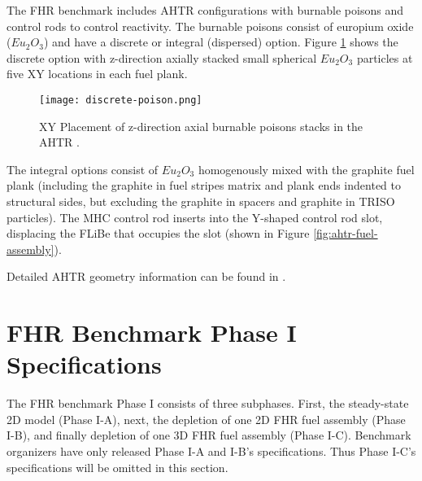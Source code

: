 The \gls{FHR} benchmark includes \gls{AHTR} configurations with burnable poisons 
and control rods to control reactivity. 
The burnable poisons consist of europium oxide ($Eu_2O_3$) and have a discrete
or integral (dispersed) option. 
Figure \ref{fig:discrete-poison} shows the discrete option with z-direction axially 
stacked small spherical $Eu_2O_3$ particles at five XY locations in each 
fuel plank. 
\begin{figure}[htbp]
    \centering
    \texttt{[image: discrete-poison.png]}
    \caption{XY Placement of z-direction axial burnable poisons stacks in the \acrlong{AHTR} 
    \cite{petrovic_benchmark_2021}.}
    \label{fig:discrete-poison}
\end{figure}
The integral options consist of $Eu_2O_3$ homogenously mixed with the graphite 
fuel plank (including the graphite in fuel stripes matrix and plank ends 
indented to structural sides, but excluding the graphite in spacers and 
graphite in TRISO particles).
The \gls{MHC} control rod inserts into the Y-shaped control rod slot, displacing
the \gls{FLiBe} that occupies the slot 
(shown in Figure \ref{fig:ahtr-fuel-assembly}). 

Detailed \gls{AHTR} geometry information can be found in \cite{petrovic_benchmark_2021}.

\section{FHR Benchmark Phase I Specifications}
\label{sec:phase1}
The \gls{FHR} benchmark Phase I consists of three subphases.
First, the steady-state 2D model (Phase I-A), next, the depletion of one 2D \gls{FHR} fuel 
assembly (Phase I-B), and finally depletion of one 3D \gls{FHR} fuel assembly 
(Phase I-C).
Benchmark organizers have only released Phase I-A and I-B's specifications. 
Thus Phase I-C's specifications will be omitted in this section.

